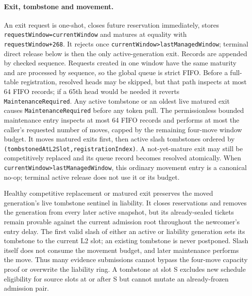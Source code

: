 \documentclass[a4paper,11pt]{article}
\newcommand{\code}[1]{\nolinkurl{#1}}
\begin{document}
\paragraph{Exit, tombstone and movement.}
An exit request is one-shot, closes future reservation immediately, stores
\code{requestWindow=currentWindow} and matures at equality with
\code{requestWindow+268}.  It rejects once
\code{currentWindow>lastManagedWindow}; terminal direct release below is then
the only active-generation exit.  Records are appended by checked sequence.  Requests
created in one window have the same maturity and are processed by sequence, so
the global queue is strict FIFO.  Before a full-table registration, resolved
heads may be skipped, but that path inspects at most 64 FIFO records; if a 65th
head would be needed it reverts \code{MaintenanceRequired}.  Any active
tombstone or an oldest live matured exit causes
\code{MaintenanceRequired} before any token pull.  The permissionless bounded
maintenance entry inspects at most 64 FIFO records and performs at most the
caller's requested number of moves, capped by the remaining four-move window
budget.  It moves matured exits first, then active slash tombstones ordered by
\code{(tombstonedAtL2Slot,registrationIndex)}.  A not-yet-mature exit may still
be competitively replaced and its queue record becomes resolved atomically.
When \code{currentWindow>lastManagedWindow}, this ordinary movement entry is a
canonical no-op; terminal active release does not use it or its budget.

Healthy competitive replacement or matured exit preserves the moved
generation's live tombstone sentinel in liability.  It closes reservations and
removes the generation from every later active snapshot, but its already-sealed
tickets remain provable against the current admission root throughout the
newcomer's entry delay.  The first valid slash of either an active or liability
generation sets its tombstone to the current L2 slot; an existing tombstone is
never postponed.  Slash itself
does not consume the movement budget, and later maintenance performs the move.
Thus many evidence submissions cannot bypass the four-move capacity proof or
overwrite the liability ring.  A tombstone at slot S excludes new schedule
eligibility for source slots at or after S but cannot mutate an already-frozen
admission pair.
\end{document}
